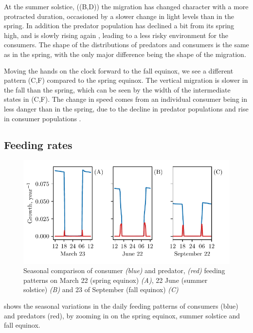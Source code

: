 At the summer solstice, ((B,D)) the migration has changed character with a more protracted duration, occasioned by a slower change in light levels than in the spring. In addition the predator population has declined a bit from its spring high, and is slowly rising again , leading to a less risky environment for the consumers. The shape of the distributions of predators and consumers is the same as in the spring, with the only major difference being the shape of the migration.

Moving the hands on the clock forward to the fall equinox, we see a different pattern (C,F) compared to the spring equinox. The vertical migration is slower in the fall than the spring, which can be seen by the width of the intermediate states in (C,F). The change in speed comes from an individual consumer being in less danger than in the spring, due to the decline in predator populations and rise in consumer populations .




\subsection{Feeding rates}
\begin{figure}[H]
\includegraphics{plots/growth_short_rational.pdf}
\caption{Seasonal comparison of consumer \emph{(blue)} and predator, \emph{(red)} feeding patterns on March 22 (spring equinox) \emph{(A)}, 22 June (summer solstice) \emph{(B)} and 23 of September (fall equinox) \emph{(C)}}
\label{fig:growth_short_rational}
\end{figure}
 shows the seasonal variations in the daily feeding patterns of consumers (blue) and predators (red), by zooming in on the spring equinox, summer solstice and fall equinox.

